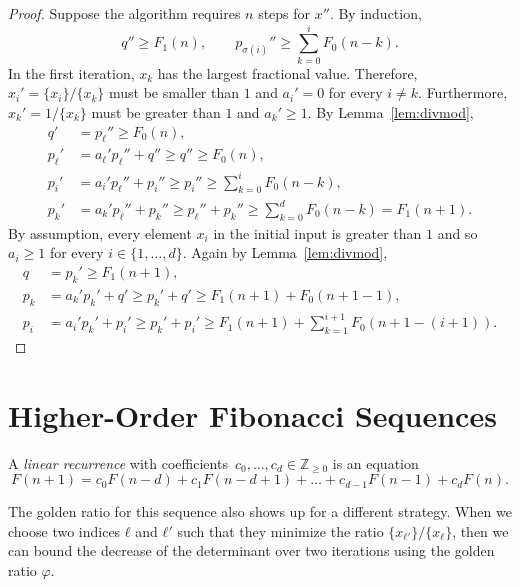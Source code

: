 \begin{proof}
  Suppose the algorithm requires $n$ steps for $x''$.
  By induction,
  \[
    q'' ≥ F_1(n),
    \qquad
    p_{σ(i)}'' ≥ ∑_{k=0}^i F_0(n - k).
  \]
  In the first iteration,
  $x_k$ has the largest fractional value.
  Therefore, $x_i' = \{x_i\}/\{x_k\}$ must be smaller than $1$ and $a_i' = 0$ for every $i ≠ k$.
  Furthermore, $x_k' = 1/\{x_k\}$ must be greater than $1$ and $a_k' ≥ 1$.
  By Lemma~\ref{lem:divmod},
  \begin{align*}
    q' & = p_ℓ'' ≥ F_0(n), \\
    p_ℓ' & = a_ℓ' p_ℓ'' + q'' ≥ q'' ≥ F_0(n), \\
    p_i' & = a_i' p_ℓ'' + p_i'' ≥ p_i'' ≥ \sum_{k=0}^i F_0(n - k), \\
    p_k' & = a_k' p_ℓ'' + p_k'' ≥ p_ℓ'' + p_k'' ≥ \sum_{k=0}^d F_0(n - k) = F_1(n+1).
  \end{align*}
  By assumption, every element $x_i$ in the initial input is greater than $1$ and
  so $a_i ≥ 1$ for every $i ∈ \{1, …, d\}$.
  Again by Lemma~\ref{lem:divmod},
  \begin{align*}
    q & = p_k' ≥ F_1(n + 1), \\
    p_k & = a_k' p_k' + q' ≥ p_k' + q' ≥ F_1(n+1) + F_0(n + 1 - 1), \\
    p_i & = a_i' p_k' + p_i' ≥ p_k' + p_i' ≥ F_1(n+1) + \sum_{k=1}^{i+1} F_0(n+1 - (i+1)).
  \end{align*}
\end{proof}


\section{Higher-Order Fibonacci Sequences}

\begin{definition}
  A \emph{linear recurrence} with coefficients~$c_0, \dots, c_d ∈ ℤ_{≥ 0}$ is an equation
  \[
    F(n + 1) = c_0 F(n - d) + c_1 F(n - d + 1) + \dots + c_{d-1} F(n - 1) + c_d F(n).
  \]
\end{definition}

\iffalse %
The golden ratio for this sequence also shows up for a different strategy.
When we choose two indices $ℓ$ and $ℓ'$ such that they minimize the ratio
$\{x_{ℓ'}\}/\{x_{ℓ}\}$, then we can bound the decrease of the determinant over
two iterations using the golden ratio $φ$.

